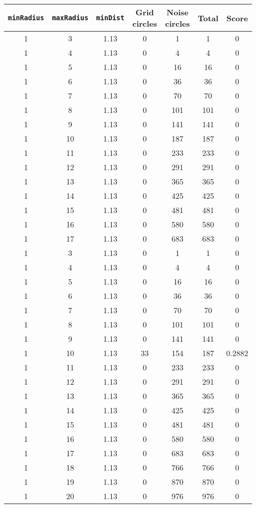 \documentclass[letterpaper, 12pt]{article}
\begin{document}
\begin{longtable}{|c|c|c|c|c|c|c|}
\hline
\textbf{\texttt{minRadius}} & \textbf{\texttt{maxRadius}} & \textbf{\texttt{minDist}} & \textbf{Grid circles} & \textbf{Noise circles} & \textbf{Total} & \textbf{Score} \\
\hline
1 & 3 & 1.13 & 0 & 1 & 1 & 0 \\
\hline
1 & 4 & 1.13 & 0 & 4 & 4 & 0 \\
\hline
1 & 5 & 1.13 & 0 & 16 & 16 & 0 \\
\hline
1 & 6 & 1.13 & 0 & 36 & 36 & 0 \\
\hline
1 & 7 & 1.13 & 0 & 70 & 70 & 0 \\
\hline
1 & 8 & 1.13 & 0 & 101 & 101 & 0 \\
\hline
1 & 9 & 1.13 & 0 & 141 & 141 & 0 \\
\hline
1 & 10 & 1.13 & 0 & 187 & 187 & 0 \\
\hline
1 & 11 & 1.13 & 0 & 233 & 233 & 0 \\
\hline
1 & 12 & 1.13 & 0 & 291 & 291 & 0 \\
\hline
1 & 13 & 1.13 & 0 & 365 & 365 & 0 \\
\hline
1 & 14 & 1.13 & 0 & 425 & 425 & 0 \\
\hline
1 & 15 & 1.13 & 0 & 481 & 481 & 0 \\
\hline
1 & 16 & 1.13 & 0 & 580 & 580 & 0 \\
\hline
1 & 17 & 1.13 & 0 & 683 & 683 & 0 \\
\hline
1 & 3 & 1.13 & 0 & 1 & 1 & 0 \\
\hline
1 & 4 & 1.13 & 0 & 4 & 4 & 0 \\
\hline
1 & 5 & 1.13 & 0 & 16 & 16 & 0 \\
\hline
1 & 6 & 1.13 & 0 & 36 & 36 & 0 \\
\hline
1 & 7 & 1.13 & 0 & 70 & 70 & 0 \\
\hline
1 & 8 & 1.13 & 0 & 101 & 101 & 0 \\
\hline
1 & 9 & 1.13 & 0 & 141 & 141 & 0 \\
\hline
1 & 10 & 1.13 & 33 & 154 & 187 & 0.2882 \\
\hline
1 & 11 & 1.13 & 0 & 233 & 233 & 0 \\
\hline
1 & 12 & 1.13 & 0 & 291 & 291 & 0 \\
\hline
1 & 13 & 1.13 & 0 & 365 & 365 & 0 \\
\hline
1 & 14 & 1.13 & 0 & 425 & 425 & 0 \\
\hline
1 & 15 & 1.13 & 0 & 481 & 481 & 0 \\
\hline
1 & 16 & 1.13 & 0 & 580 & 580 & 0 \\
\hline
1 & 17 & 1.13 & 0 & 683 & 683 & 0 \\
\hline
1 & 18 & 1.13 & 0 & 766 & 766 & 0 \\
\hline
1 & 19 & 1.13 & 0 & 870 & 870 & 0 \\
\hline
1 & 20 & 1.13 & 0 & 976 & 976 & 0 \\
\hline
\end{longtable}
\end{document}
